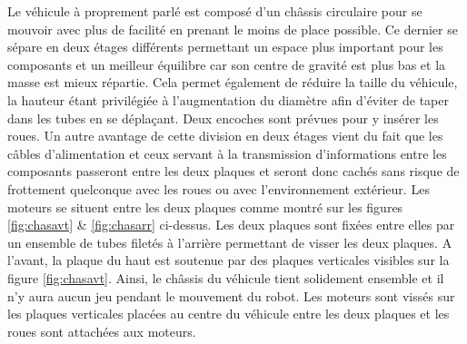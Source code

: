 \documentclass[a4paper,11pt]{article}
\begin{document}
Le véhicule à proprement parlé est composé d'un châssis circulaire pour se mouvoir avec plus de facilité en prenant le moins de place possible. Ce dernier se sépare en deux étages différents permettant un espace plus important pour les composants et un meilleur équilibre car son centre de gravité est plus bas et la masse est mieux répartie. Cela permet également de réduire la taille du véhicule, la hauteur étant privilégiée à l'augmentation du diamètre afin d'éviter de taper dans les tubes en se déplaçant. Deux encoches sont prévues pour y insérer les roues. Un autre avantage de cette division en deux étages vient du fait que les câbles d'alimentation et ceux servant à la transmission d'informations entre les composants passeront entre les deux plaques et seront donc cachés sans risque de frottement quelconque avec les roues ou avec l'environnement extérieur. Les moteurs se situent entre les deux plaques comme montré sur les figures \ref{fig:chasavt} \& \ref{fig:chasarr} ci-dessus. Les deux plaques sont fixées entre elles par un ensemble de tubes filetés à l'arrière permettant de visser les deux plaques. A l'avant, la plaque du haut est soutenue par des plaques verticales visibles sur la figure \ref{fig:chasavt}. Ainsi, le châssis du véhicule tient solidement ensemble et il n'y aura aucun jeu pendant le mouvement du robot. Les moteurs sont vissés sur les plaques verticales placées au centre du véhicule entre les deux plaques et les roues sont attachées aux moteurs.
\newline
\end{document}
